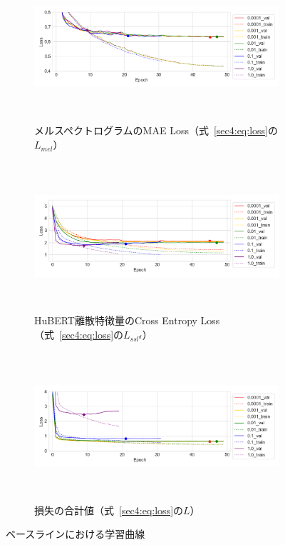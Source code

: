 \documentclass[12pt]{jarticle}
\numberwithin{equation}{section}    %
\numberwithin{figure}{section}      %
\numberwithin{table}{section}      %
\begin{document}
\begin{figure}[bt]
    \centering
    \begin{subfigure}{\linewidth}
        \centering
        \includegraphics[height=55mm]{./figure/sec4/learning_curves/0/mel_loss.png}
        \caption{メルスペクトログラムのMAE Loss（式~\eqref{sec4:eq:loss}の$L_{mel}$）}
        \label{sec4:fig:learning_curve_baseline_val_mel_loss}
    \end{subfigure}
    \begin{subfigure}{\linewidth}
        \centering
        \includegraphics[height=55mm]{./figure/sec4/learning_curves/0/ssl_feature_cluster_loss.png}
        \caption{HuBERT離散特徴量のCross Entropy Loss（式~\eqref{sec4:eq:loss}の$L_{ssl^{d}}$）}
        \label{sec4:fig:learning_curve_baseline_val_ssl_feature_cluster_loss}
    \end{subfigure}
    \begin{subfigure}{\linewidth}
        \centering
        \includegraphics[height=55mm]{./figure/sec4/learning_curves/0/total_loss.png}
        \caption{損失の合計値（式~\eqref{sec4:eq:loss}の$L$）}
        \label{sec4:fig:learning_curve_baseline_val_total_loss}
    \end{subfigure}
    \caption{ベースラインにおける学習曲線}
    \label{sec4:fig:learning_curve_baseline_val_losses}
\end{figure}
\end{document}
